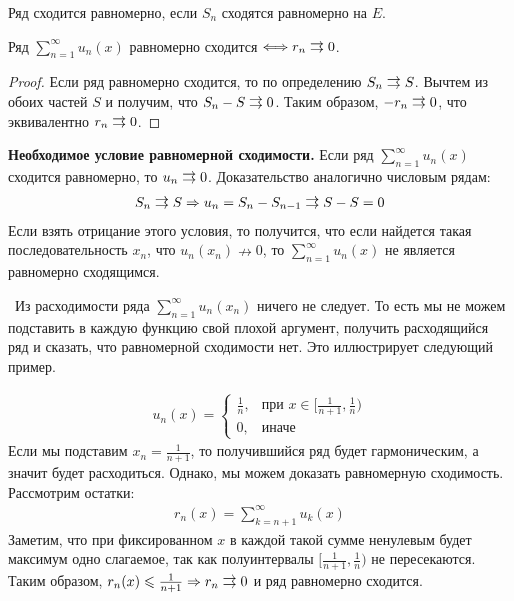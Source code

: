 \vspace*{5mm}

\begin{conj}
    Ряд сходится равномерно, если $S_n$ сходятся равномерно на $E$.
\end{conj}

\begin{theorem}
    Ряд $\sum\limits_{n = 1}^\infty u_n(x)$ равномерно сходится $\Longleftrightarrow r_n \doublerightarrow 0$. 
\end{theorem}
\begin{proof}
    Если ряд равномерно сходится, то по определению $S_n \doublerightarrow S$.
    Вычтем из обоих частей $S$ и получим, что $S_n - S \doublerightarrow 0$.
    Таким образом, $-r_n \doublerightarrow 0$, что эквивалентно $r_n \doublerightarrow 0$.
\end{proof}

\vspace*{5mm}

\textbf{Необходимое условие равномерной сходимости.} Если ряд $\sum\limits_{n = 1}^\infty u_n(x)$ сходится равномерно, то $u_n \doublerightarrow 0$.
Доказательство аналогично числовым рядам: 
\begin{gather*}
    S_n \doublerightarrow S \Rightarrow u_n = S_n - S_{n-1} \doublerightarrow S - S = 0
\end{gather*}
Если взять отрицание этого условия, то получится, что если найдется такая последовательность $x_n$, что $u_n(x_n) \nrightarrow 0$, то $\sum\limits_{n = 1}^\infty u_n(x)$ не является равномерно сходящимся.
    
\notice \, Из расходимости ряда $\sum\limits_{n = 1}^\infty u_n(x_n)$ ничего не следует.
То есть мы не можем подставить в каждую функцию свой плохой аргумент, получить расходящийся ряд и сказать, что равномерной сходимости нет.
Это иллюстрирует следующий пример.

\begin{example}
    \begin{gather*}
        u_n(x) = \begin{cases}
            \frac{1}{n}, & \text{при }x \in [\frac{1}{n + 1}, \frac{1}{n}) \\
            0, & \text{иначе}
        \end{cases}
    \end{gather*}
    \quad Если мы подставим $x_n = \frac{1}{n+1}$, то получившийся ряд будет гармоническим, а значит будет расходиться.
    Однако, мы можем доказать равномерную сходимость. 
    Рассмотрим остатки: 
    \begin{gather*}
        r_n(x) = \sum\limits_{k = n + 1}^\infty u_k(x)
    \end{gather*}
    Заметим, что при фиксированном $x$ в каждой такой сумме ненулевым будет максимум одно слагаемое, так как полуинтервалы $[\frac{1}{n+1}, \frac{1}{n})$ не пересекаются.
    Таким образом, $r_n(x) \leqslant \frac{1}{n+1} \Rightarrow r_n \doublerightarrow 0$ и ряд равномерно сходится.
\end{example}

